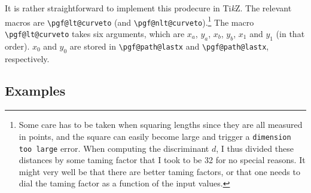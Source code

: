 \documentclass{article}
\begin{document}
It is rather straightforward to implement this
prodecure in Ti\emph{k}Z. The relevant macros are \verb|\pgf@lt@curveto| (and
\verb|\pgf@nlt@curveto|).\footnote{Some care has to be taken when squaring
lengths since they are all measured in points, and the square can easily become
large and trigger a \texttt{dimension too large} error. When computing the
discriminant $d$, I thus divided these distances by some taming factor that I
took to be 32 for no special reasons. It might very well be that there are
better taming factors, or that one needs to dial the taming factor as a function
of the input values.} The macro \verb|\pgf@lt@curveto| takes six arguments,
which are $x_a$, $y_a$, $x_b$, $y_b$, $x_1$ and $y_1$ (in that order). $x_0$ and
$y_0$ are stored in \verb|\pgf@path@lastx| and \verb|\pgf@path@lastx|,
respectively.

\subsection*{Examples}

\makeatletter
\def\pgf@lt@curveto#1#2#3#4#5#6{%
  \pgfmathparse{((#1/32)*(#1/32)-1*((#1/32)*(#3/32))+(#3/32)*(#3/32)-1*((#1/32)*(#5/32))+(-(#3/32)+(#5/32))*(\pgf@path@lastx/32))}%
  \pgfutil@tempdima=\pgfmathresult pt %
  \ifdim\pgfutil@tempdima>0pt%
   \pgfmathsetmacro{\tone}{min(1,max(0,(\pgf@path@lastx-2*#1+#3-32*sqrt(\pgfutil@tempdima))/(\pgf@path@lastx-#5-3*#1+3*#3)))}%
   \pgfmathparse{\pgf@path@lastx*pow(1-\tone,3)+3*#1*pow(1-\tone,2)*\tone+3*#3*(1-\tone)*\tone*\tone+#5*pow(\tone,3)}%
   \pgf@protocolsizes{\pgfmathresult pt}{#6}%
   \pgfmathsetmacro{\tone}{min(1,max(0,(\pgf@path@lastx-2*#1+#3+32*sqrt(\pgfutil@tempdima))/(\pgf@path@lastx-#5-3*#1+3*#3)))}%
   \pgfmathparse{\pgf@path@lastx*pow(1-\tone,3)+3*#1*pow(1-\tone,2)*\tone+3*#3*(1-\tone)*\tone*\tone+#5*pow(\tone,3)}%
   \pgf@protocolsizes{\pgfmathresult pt}{#6}%
  \fi%
  \pgfmathparse{((#2/32)*(#2/32)-1*((#2/32)*(#4/32))+(#4/32)*(#4/32)-1*((#2/32)*(#6/32))+(-(#4/32)+(#6/32))*(\pgf@path@lasty/32))}%
  \pgfutil@tempdima=\pgfmathresult pt %
  \ifdim\pgfutil@tempdima>0pt%
   \pgfmathsetmacro{\tone}{min(1,max(0,(\pgf@path@lasty-2*#2+#4-32*sqrt(\pgfutil@tempdima))/(\pgf@path@lasty-#6-3*#2+3*#4)))}%
   \pgfmathparse{\pgf@path@lasty*pow(1-\tone,3)+3*#2*pow(1-\tone,2)*\tone+3*#4*(1-\tone)*\tone*\tone+#6*pow(\tone,3)}%
   \pgf@protocolsizes{#5}{\pgfmathresult pt}%
   \pgfmathsetmacro{\tone}{min(1,max(0,(\pgf@path@lasty-2*#2+#4+32*sqrt(\pgfutil@tempdima))/(\pgf@path@lasty-#6-3*#2+3*#4)))}%
   \pgfmathparse{\pgf@path@lasty*pow(1-\tone,3)+3*#2*pow(1-\tone,2)*\tone+3*#4*(1-\tone)*\tone*\tone+#6*pow(\tone,3)}%
   \pgf@protocolsizes{#5}{\pgfmathresult pt}%
  \fi%
  \pgf@protocolsizes{\the\pgf@path@lastx}{\the\pgf@path@lasty}%
  \pgf@protocolsizes{#5}{#6}%
  \pgfsyssoftpath@curveto{\the#1}{\the#2}{\the#3}{\the#4}{\the#5}{\the#6}%
}
\let\pgf@nlt@curveto\pgf@lt@curveto
\makeatother 
\end{document}
